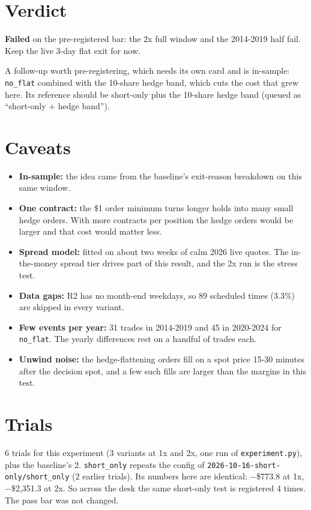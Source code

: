 \documentclass{article}
\begin{document}
\section{Verdict}

\textbf{Failed} on the pre-registered bar: the 2x full window and the 2014-2019 half fail. Keep the live 3-day flat exit for now.

A follow-up worth pre-registering, which needs its own card and is in-sample: \texttt{no\_\allowbreak{}flat} combined with the 10-share hedge band, which cuts the cost that grew here. Its reference should be short-only plus the 10-share hedge band (queued as ``short-only + hedge band'').

\section{Caveats}

\begin{itemize}

\item \textbf{In-sample:} the idea came from the baseline's exit-reason breakdown on this same window.

\item \textbf{One contract:} the \$1 order minimum turns longer holds into many small hedge orders. With more contracts per position the hedge orders would be larger and that cost would matter less.

\item \textbf{Spread model:} fitted on about two weeks of calm 2026 live quotes. The in-the-money spread tier drives part of this result, and the 2x run is the stress test.

\item \textbf{Data gaps:} R2 has no month-end weekdays, so 89 scheduled times (3.3\%) are skipped in every variant.

\item \textbf{Few events per year:} 31 trades in 2014-2019 and 45 in 2020-2024 for \texttt{no\_\allowbreak{}flat}. The yearly differences rest on a handful of trades each.

\item \textbf{Unwind noise:} the hedge-flattening orders fill on a spot price 15-30 minutes after the decision spot, and a few such fills are larger than the margins in this test.

\end{itemize}

\section{Trials}

6 trials for this experiment (3 variants at 1x and 2x, one run of \texttt{experiment.\allowbreak{}py}), plus the baseline's 2. \texttt{short\_\allowbreak{}only} repeats the config of \texttt{2026-\allowbreak{}10-\allowbreak{}16-\allowbreak{}short-\allowbreak{}only/\allowbreak{}short\_\allowbreak{}only} (2 earlier trials). Its numbers here are identical: \ensuremath{-}\$773.8 at 1x, \ensuremath{-}\$2,351.3 at 2x. So across the desk the same short-only test is registered 4 times. The pass bar was not changed.
\end{document}
